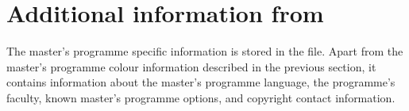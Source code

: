 \section{Additional information from }\label{sec:mastercfg}
The master's programme specific information is stored in the 
file. Apart from the master's programme colour information described in the
previous section, it contains information about the master's programme
language, the programme's faculty, known master's programme options, and
copyright contact information.

\begingroup
\makeatletter
{}%
\let\kulemt@end@master@def\endinput
\def\ProvidesFile #1[#2]{%
  This section describes the \file{#1} file dated \printdateTeX{#2}.
  If no faculty name is shown, it is an inter-faculty
  master's programme.\par\raggedright}
\renewcommand*\kulemt@div@master[1]{\subsection{#1}}
\sideparswitchfalse \reversesidepartrue
\newcommand*\optionHangfrom{}
\newcommand*\handleOption[2]{%
  \ifvmode \@hangfrom{\optionHangfrom}\else \break \fi
  \textbf{--} \ \texttt{#1} (`#2')}
\newcommand*\printmasterinfo[2]{\par
  \addvspace\medskipamount \parindent\z@
  \kulemt@filingcardfalse \kulemt@set@master#2{}{}{}\@nil
  \leavevmode\sidepar{\raggedleft\texttt{#1}}\textsc{\kulemt@master@title}\par
  \nobreak \expandafter\MakeUppercase\kulemt@master@language\space master%
  \edef\@tempa{\kulemt@fac@name}\ifx\@tempa\@empty\else\space of the \@tempa\fi.
  \par
  \nobreak \@hangfrom{Contact info: }\kulemt@contact@print\par
  \nobreak
  \ifx\kulemt@master@options@vl\relax
    The master's programme doesn't allow you to mention an option.%
  \else\ifx\kulemt@master@options@vl\@empty
    The master's programme doesn't require you to mention an option.%
  \else
    One of the following master's programme options \emph{must} be used:
    \def\@tempb{}\@for\@tempa:=\kulemt@master@options@vl\do{%
      \@tempb\texttt{\@tempa}\def\@tempb{, }}.%
  \fi\fi \par
  \@tempswatrue \ifx\kulemt@master@options@v\@empty
    \ifx\kulemt@master@options@o\@empty \@tempswafalse \fi\fi
  \if@tempswa
    \nobreak Known master's programme option abbreviations:\par%
    \ifx\kulemt@master@options@v\@empty\else
      \def\optionHangfrom{\quad}%
      \nobreak \kulemt@handle@mo\kulemt@master@options@v\handleOption \par
    \fi
    \ifx\kulemt@master@options@o\@empty\else
      \def\optionHangfrom{\quad obsolete: \ }%
      \nobreak \kulemt@handle@mo\kulemt@master@options@o\handleOption \par
    \fi
  \fi}
\let\kulemt@def@master\printmasterinfo
\newif\ifobsoletemaster
\renewcommand*\kulemt@obsolete@master[3][]{\obsoletemastertrue}

